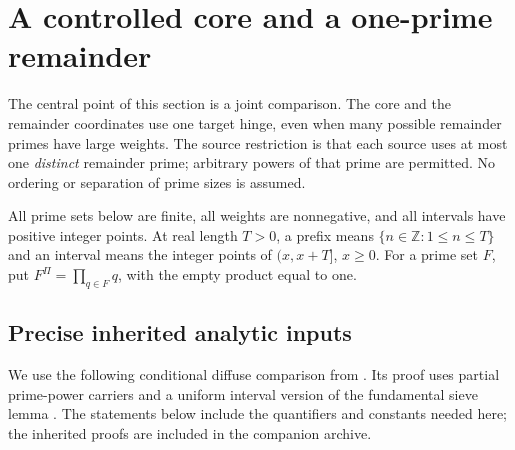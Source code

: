 \section{A controlled core and a one-prime remainder}
\label{cg:section}

The central point of this section is a joint comparison. The core and
the remainder coordinates use one target hinge, even when many possible
remainder primes have large weights. The source restriction is that
each source uses at most one \emph{distinct} remainder prime; arbitrary
powers of that prime are permitted. No ordering or separation of prime
sizes is assumed.

All prime sets below are finite, all weights are nonnegative, and all
intervals have positive integer points. At real length $T>0$, a prefix
means $\{n\in\mathbb Z:1\le n\le T\}$ and an interval means the
integer points of $(x,x+T]$, $x\ge0$. For a prime set $F$, put
$F^\Pi=\prod_{q\in F}q$, with the empty product equal to one.

\subsection{Precise inherited analytic inputs}

We use the following conditional diffuse comparison from
\cite{Synthesis}. Its proof uses partial prime-power carriers and a
uniform interval version of the fundamental sieve lemma
\cite{Lagarias,GranvilleSound}. The statements below include the
quantifiers and constants needed here; the inherited proofs are included
in the companion archive.

